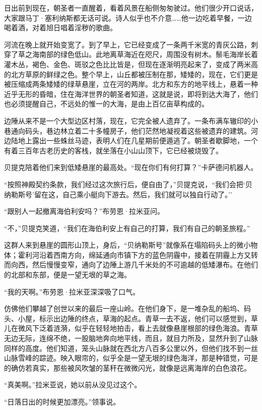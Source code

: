 \documentclass[AutoFakeBold=true]{book}
\begin{document}
日出前到现在，朝圣者一直醒着，看着风景在船侧匆匆驶过。他们很少开口说话，大家跟马丁·塞利纳斯都无话可说。诗人似乎也不介意……他一边吃着早餐，一边喝着酒，对着旭日唱着淫秽的歌曲。

河流在晚上就开始变宽了。到了早上，它已经变成了一条两千米宽的青灰公路，刺穿了草之海南部的绿色低山。此地离草海近在咫尺，周围没有树木。鬃毛海岸长着灌木丛，褐色、金色、斑驳之色比比皆是，但现在逐渐明亮起来了，变成了两米高的北方草原的鲜绿之色。整个早上，山丘都被压制在那，矮矮的，现在，它们更是被压缩成两条矮矮的绿草悬崖，立在河的两岸。北方和东方的地平线上，悬着一种近乎无形的昏暗，住在海洋世界的朝圣者知道，这就是说，即将到达大海了，他们也必须提醒自己，不远处的惟一的大海，是由上百亿亩草构成的。

边陲从来不是一个大型边区村落，现在，它完全被人遗弃了。一条布满车辙印的小巷通向码头，巷边林立着二十多幢房子，他们茫然地凝视着这些被遗弃的建筑。河边陆地上露出一些蛛丝马迹，表明人们在几星期前便遁逃了。朝圣者歇脚地，一个有着三百年古老历史的客栈，就坐落在小山山顶下，它已经被烧毁了。

贝提克陪着他们来到低矮悬崖的最高处。``现在你们有何打算？''卡萨德问机器人。

``按照神殿契约条款，我们经过这次旅行后，便自由了，''贝提克说，``我们会把`贝纳勒斯号'留在这，自己乘小艇向下游去。然后，我们就可以独自行动了。''

``跟别人一起撤离海伯利安吗？''布劳恩·拉米亚问。

``不，''贝提克笑道，``我们在海伯利安上有自己的打算，我们有自己的朝圣旅程。''

这群人来到悬崖的圆形山顶上，身后，``贝纳勒斯号''就像系在塌陷码头上的微小物体；霍利河沿着西南方向，绵延通向市镇下方的蓝色阴霾中，接着在阴霾上方又转而向西，然后慢慢变窄，通向了边陲上游几千米处的不可逾越的低矮瀑布。在他们的北部和东部，便是一望无垠的草之海。

``我的天啊。''布劳恩·拉米亚深深吸了口气。

仿佛他们攀越了创世以来的最后一座山岭。在他们身下，是一堆杂乱的船坞、码头、小屋，标示出边陲的终点，草海的起点。青草一去不返，他们可以感觉到，草儿在微风下泛着涟漪，似乎在轻轻地拍击，看上去就像悬崖根部的绿色海浪。青草无边无际，连绵不绝，一股脑地奔向地平线，而且，就目力所及，显然升到了山脉同样的高度。他们知道，笼头山脉就在西北方八百多公里以外，但他们找不到一丝山脉雪峰的踪迹。映入眼帘的，似乎全是一望无垠的绿色海洋，那是种错觉，可是的确仿若真实，那些被风吹皱的茎秆在微微闪光，就像是远离海岸的白色浪花。

``真美啊。''拉米亚说，她以前从没见过这个。

``日落日出的时候更加漂亮。''领事说。
\end{document}

